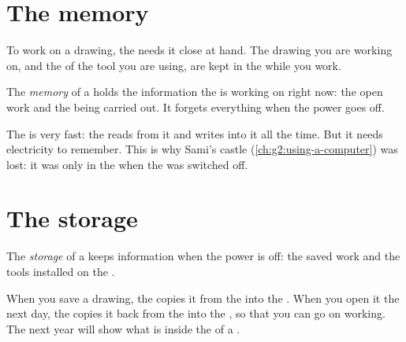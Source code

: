 \section{The memory}

To work on a drawing, the  needs it close at hand. The drawing you
are working on, and the  of the tool you are using, are kept in
the  while you work.

\begin{definition}[Memory]\label{def:g3:inside-the-computer:memory}
The \emph{memory} of a  holds the
information the  is working on right now: the open work and the
 being carried out. It forgets everything when the power goes off.
\end{definition}

The  is very fast: the  reads from it and writes into it all the
time. But it needs electricity to remember. This is why Sami's castle (\cref{ch:g2:using-a-computer}) was
lost: it was only in the  when the  was switched off.

\section{The storage}

\begin{definition}[Storage]\label{def:g3:inside-the-computer:storage}
The \emph{storage} of a  keeps information when the
power is off: the saved work and the tools installed on the .
\end{definition}

When you save a drawing, the  copies it from the  into the
. When you open it the next day, the  copies it back from the
 into the , so that you can go on working. The next year will
show what is inside the  of a .

